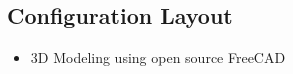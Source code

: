 \documentclass[]{article}
\begin{document}
\subsection{Configuration Layout}

\begin{itemize}
\item 3D Modeling using open source FreeCAD
\end{itemize}
\end{document}
